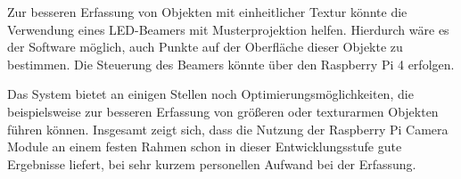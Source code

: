 \documentclass[./00PhotoBox.tex]{subfiles}
\begin{document}
Zur besseren Erfassung von Objekten mit einheitlicher Textur könnte die Verwendung eines LED-Beamers mit Musterprojektion helfen. Hierdurch wäre es der Software möglich, auch Punkte auf der Oberfläche dieser Objekte zu bestimmen. Die Steuerung des Beamers könnte über den Raspberry Pi 4 erfolgen.


Das System bietet an einigen Stellen noch Optimierungsmöglichkeiten, die beispielsweise zur besseren Erfassung von größeren oder texturarmen Objekten führen können. Insgesamt zeigt sich, dass die Nutzung der Raspberry Pi Camera Module an einem festen Rahmen schon in dieser Entwicklungsstufe gute Ergebnisse liefert, bei sehr kurzem personellen Aufwand bei der Erfassung.


\biblio
\end{document}
